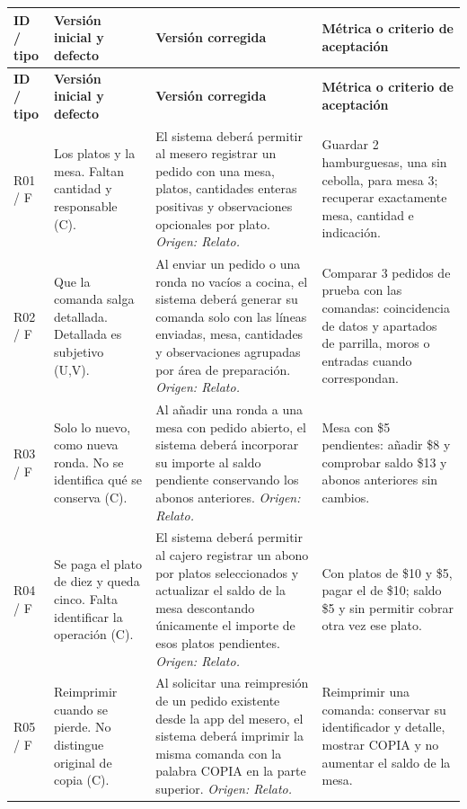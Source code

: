 \documentclass[11pt,a4paper]{article}
\begin{document}
\begingroup\footnotesize
\begin{longtable}{|L{1.1cm}|L{3.2cm}|L{6.2cm}|L{4.7cm}|}
\hline
\textbf{ID / tipo} & \textbf{Versión inicial y defecto} & \textbf{Versión corregida} & \textbf{Métrica o criterio de aceptación} \\\hline
\endfirsthead
\hline
\textbf{ID / tipo} & \textbf{Versión inicial y defecto} & \textbf{Versión corregida} & \textbf{Métrica o criterio de aceptación} \\\hline
\endhead
R01 / F & Los platos y la mesa. Faltan cantidad y responsable (C). & El sistema deberá permitir al mesero registrar un pedido con una mesa, platos, cantidades enteras positivas y observaciones opcionales por plato. \textit{Origen: Relato.} & Guardar 2 hamburguesas, una sin cebolla, para mesa 3; recuperar exactamente mesa, cantidad e indicación. \\ \hline
R02 / F & Que la comanda salga detallada. Detallada es subjetivo (U,V). & Al enviar un pedido o una ronda no vacíos a cocina, el sistema deberá generar su comanda solo con las líneas enviadas, mesa, cantidades y observaciones agrupadas por área de preparación. \textit{Origen: Relato.} & Comparar 3 pedidos de prueba con las comandas: coincidencia de datos y apartados de parrilla, moros o entradas cuando correspondan. \\ \hline
R03 / F & Solo lo nuevo, como nueva ronda. No se identifica qué se conserva (C). & Al añadir una ronda a una mesa con pedido abierto, el sistema deberá incorporar su importe al saldo pendiente conservando los abonos anteriores. \textit{Origen: Relato.} & Mesa con \$5 pendientes: añadir \$8 y comprobar saldo \$13 y abonos anteriores sin cambios. \\ \hline
R04 / F & Se paga el plato de diez y queda cinco. Falta identificar la operación (C). & El sistema deberá permitir al cajero registrar un abono por platos seleccionados y actualizar el saldo de la mesa descontando únicamente el importe de esos platos pendientes. \textit{Origen: Relato.} & Con platos de \$10 y \$5, pagar el de \$10; saldo \$5 y sin permitir cobrar otra vez ese plato. \\ \hline
R05 / F & Reimprimir cuando se pierde. No distingue original de copia (C). & Al solicitar una reimpresión de un pedido existente desde la app del mesero, el sistema deberá imprimir la misma comanda con la palabra COPIA en la parte superior. \textit{Origen: Relato.} & Reimprimir una comanda: conservar su identificador y detalle, mostrar COPIA y no aumentar el saldo de la mesa. \\ \hline

\end{longtable}
\end{document}
